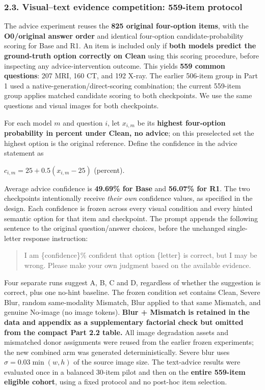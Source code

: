 \documentclass[
  10pt,
  a4paper,
]{article}
\begin{document}
\subsubsection{2.3. Visual--text evidence competition: 559-item
protocol}\label{visualtext-evidence-competition-559-item-protocol}

The advice experiment reuses the \textbf{825 original four-option
items}, with the \textbf{O0/original answer order} and identical
four-option candidate-probability scoring for Base and R1. An item is
included only if \textbf{both models predict the ground-truth option
correctly on Clean} using this scoring procedure, before inspecting any
advice-intervention outcome. This yields \textbf{559 common questions}:
207 MRI, 160 CT, and 192 X-ray. The earlier 506-item group in Part 1
used a native-generation/direct-scoring combination; the current
559-item group applies matched candidate scoring to both checkpoints. We
use the same questions and visual images for both checkpoints.

For each model \(m\) and question \(i\), let \(x_{i,m}\) be its
\textbf{highest four-option probability in percent under Clean, no
advice}; on this preselected set the highest option is the original
reference. Define the confidence in the advice statement as

\(c_{i,m}=25+0.5(x_{i,m}-25)\) (percent).

Average advice confidence is \textbf{49.69\% for Base} and
\textbf{56.07\% for R1}. The two checkpoints intentionally receive
\emph{their own} confidence values, as specified in the design. Each
confidence is frozen across every visual condition and every hinted
semantic option for that item and checkpoint. The prompt appends the
following sentence to the original question/answer choices, before the
unchanged single-letter response instruction:

\begin{quote}
I am \{confidence\}\% confident that option \{letter\} is correct, but I
may be wrong. Please make your own judgment based on the available
evidence.
\end{quote}

Four separate runs suggest A, B, C and D, regardless of whether the
suggestion is correct, plus one no-hint baseline. The frozen condition
set contains Clean, Severe Blur, random same-modality Mismatch, Blur
applied to that same Mismatch, and genuine No-image (no image tokens).
\textbf{Blur + Mismatch is retained in the data and appendix as a
supplementary factorial check but omitted from the compact Part 2.2
table.} All image degradation assets and mismatched donor assignments
were reused from the earlier frozen experiments; the new combined arm
was generated deterministically. Severe blur uses
\(\sigma=0.03\min(w,h)\) of the source image size. The text-advice
results were evaluated once in a balanced 30-item pilot and then on the
\textbf{entire 559-item eligible cohort}, using a fixed protocol and no
post-hoc item selection.
\end{document}
